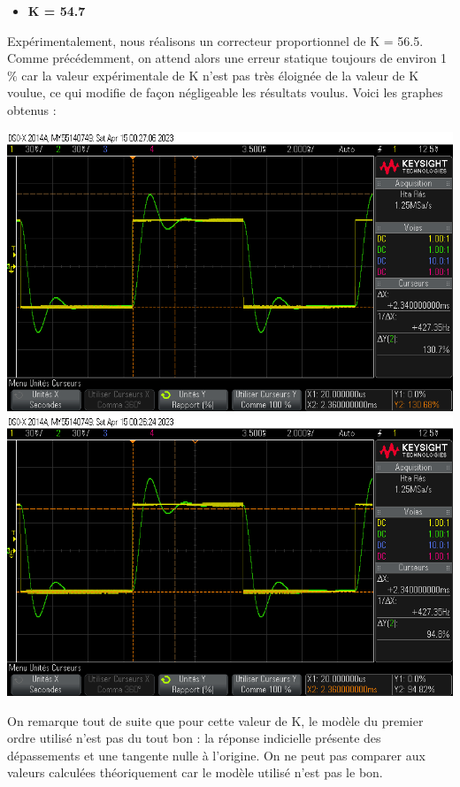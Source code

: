 \documentclass[12pt]{article}
\begin{document}
\begin{itemize}
\item \bf \large K = 54.7
\end{itemize}
Expérimentalement, nous réalisons un correcteur proportionnel de K = 56.5. Comme précédemment, on attend alors une erreur statique toujours de environ 1$\%$ car la valeur expérimentale de K n'est pas très éloignée de la valeur de K voulue, ce qui modifie de façon négligeable les résultats voulus. Voici les graphes obtenus : 
\begin{center}
    \includegraphics[width = 16 cm]{TP3/Syst_1/P/14_04_2023_depk55.png}
    \includegraphics[width = 16 cm]{TP3/Syst_1/P/14_04_2023_tr_k55.png}
\end{center}
On remarque tout de suite que pour cette valeur de K, le modèle du premier ordre utilisé n'est pas du tout bon : la réponse indicielle présente des dépassements et une tangente nulle à l'origine. On ne peut pas comparer aux valeurs calculées théoriquement car le modèle utilisé n'est pas le bon.
\end{document}
